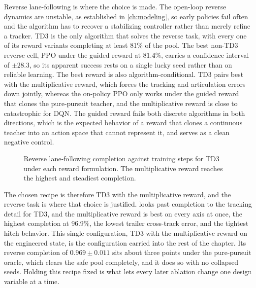 Reverse lane-following is where the choice is made. The open-loop reverse dynamics are unstable, as established in \cref{ch:modeling}, so early policies fail often and the algorithm has to recover a stabilizing controller rather than merely refine a tracker. TD3 is the only algorithm that solves the reverse task, with every one of its reward variants completing at least 81\% of the pool. The best non-TD3 reverse cell, PPO under the guided reward at 81.4\%, carries a confidence interval of $\pm 28.3$, so its apparent success rests on a single lucky seed rather than on reliable learning. The best reward is also algorithm-conditional. TD3 pairs best with the multiplicative reward, which forces the tracking and articulation errors down jointly, whereas the on-policy PPO only works under the guided reward that clones the pure-pursuit teacher, and the multiplicative reward is close to catastrophic for DQN. The guided reward fails both discrete algorithms in both directions, which is the expected behavior of a reward that clones a continuous teacher into an action space that cannot represent it, and serves as a clean negative control.

\begin{figure}[H]
    \centering
    \caption{Reverse lane-following completion against training steps for TD3 under each reward formulation. The multiplicative reward reaches the highest and steadiest completion.}
    \label{fig:reverse_reward_ablation}
\end{figure}

The chosen recipe is therefore TD3 with the multiplicative reward, and the reverse task is where that choice is justified.  looks past completion to the tracking detail for TD3, and the multiplicative reward is best on every axis at once, the highest completion at 96.9\%, the lowest trailer cross-track error, and the tightest hitch behavior. This single configuration, TD3 with the multiplicative reward on the engineered state, is the configuration carried into the rest of the chapter. Its reverse completion of $0.969 \pm 0.011$ sits about three points under the pure-pursuit oracle, which clears the safe pool completely, and it does so with no collapsed seeds. Holding this recipe fixed is what lets every later ablation change one design variable at a time.

